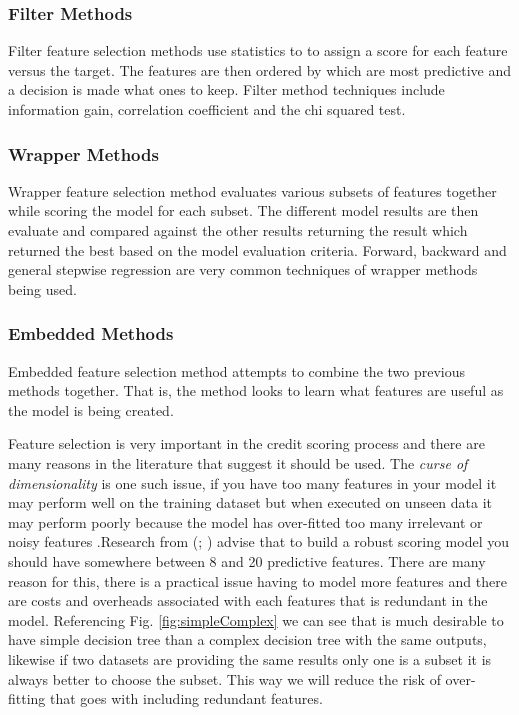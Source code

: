 \subsubsection{Filter Methods}
Filter feature selection methods use statistics to to assign a score for each feature versus the target. The features are then ordered by which are most predictive and a decision is made what ones to keep. Filter method techniques include information gain, correlation coefficient and the chi squared test.

\subsubsection{Wrapper Methods}
Wrapper feature selection method evaluates various subsets of features together while scoring the model for each subset. The different model results are then evaluate and compared against the other results returning the result which returned the best based on the model evaluation criteria. Forward, backward and general stepwise regression are very common techniques of wrapper methods being used.

\subsubsection{Embedded Methods}
Embedded feature selection method attempts to combine the two previous methods together. That is, the method looks to learn what features are useful as the model is being created. 

Feature selection is very important in the credit scoring process and there are many reasons in the literature that suggest it should be used. The \textit{curse of dimensionality} is one such issue, if you have too many features in your model it may perform well on the training dataset but when executed on unseen data it may perform poorly because the model has over-fitted too many irrelevant or noisy features \citep{loughrey_overfitting_2005}.Research from (\cite{thomas_consumer_2009}; \cite{mays_credit_2004})  advise that to build a robust scoring model you should have somewhere between 8 and 20 predictive features. There are many reason for this, there is a practical issue having to model more features and there are costs and overheads associated with each features that is redundant in the model. Referencing Fig. \ref{fig:simpleComplex} we can see that is much desirable to have simple decision tree than a complex decision tree with the same outputs, likewise if two datasets are providing the same results only one is a subset it is always better to choose the subset. This way we will reduce the risk of over-fitting that goes with including redundant features.

